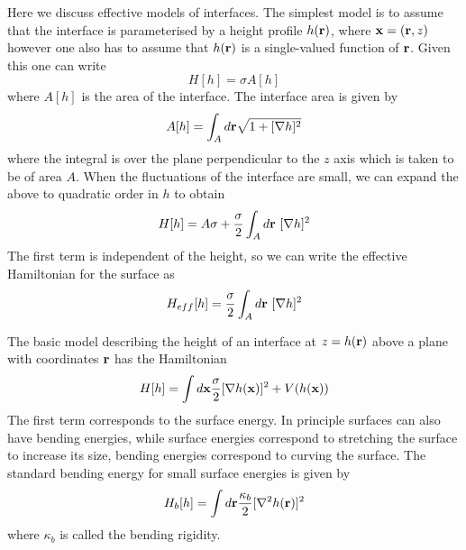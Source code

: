 Here we discuss effective models of interfaces. The simplest model is to assume that the 
interface is parameterised by a height profile $h({\bf r})$, where ${\bf x} = ({\bf r},z)$ however one also has to assume that 
$h({\bf r})$ is a single-valued function of ${\bf r}$. Given this one can write
\begin{equation}
H[h] = \sigma A[h]
\end{equation}
where $A[h]$ is the area of the interface. The interface area is given by
\begin{equation}
A[h] = \int_A d{\bf r}\sqrt{1+[\nabla h]^2}
\end{equation}
where the integral is over the plane perpendicular to the $z$ axis which is taken to be of area $A$. When the fluctuations of the interface are small, we can expand the above to quadratic order in $h$ to obtain
\begin{equation}
H[h]= A\sigma +\frac{\sigma}{2} \int_A d{\bf r} \ [\nabla h]^2
\end{equation}
The first term is independent of the height, so we can write the effective Hamiltonian for the surface as
\begin{equation}
H_{eff} [h]= \frac{\sigma}{2} \int_A d\br\ [\nabla h]^2
\label{heff}
\end{equation}

The basic model describing the height of an interface at $z=h({\bf r})$ above a plane with coordinates ${\bf r}$ has the Hamiltonian 
\begin{equation}
H[h] = \int d{\bf x}\frac{\sigma}{2} [\nabla h({\bf x})]^2 + V(h({\bf x}))
\end{equation}
The first term corresponds to the surface energy. In principle surfaces can also have bending energies, while surface energies correspond to stretching the surface to increase its size, bending energies correspond to curving the surface. The standard bending energy for small surface energies \cite{diehl_interface_1980} is given by
\begin{equation}
H_b[h] = \int d{\bf r} \frac{\kappa_b}{2}[\nabla^2 h({\bf r})]^2
\end{equation} 
where $\kappa_b$ is called the bending rigidity.

